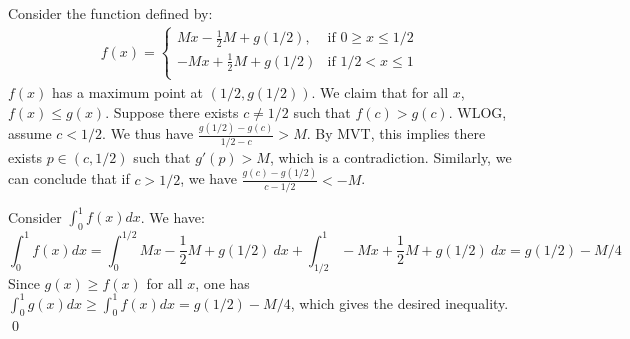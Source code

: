\documentclass{article}
\begin{document}
\begin{enumerate}[label=\alph*)]
        Consider the function defined by:
        \begin{align*}
            f(x) =
            \begin{cases}
                Mx-\frac{1}{2}M+g(1/2),  & \text{if $0\geq x\leq 1/2$} \\
                -Mx+\frac{1}{2}M+g(1/2)  & \text{if $1/2<x \leq 1$}\\
            \end{cases}
        \end{align*}
        $f(x)$ has a maximum point at $(1/2, g(1/2))$. We claim that for all $x$, $f(x) \leq g(x)$. Suppose there exists $c \neq 1/2$ such that $f(c)>g(c)$. WLOG, assume $c < 1/2$. We thus have $\frac{g(1/2)-g(c)}{1/2-c}>M$. By MVT, this implies there exists $p \in (c, 1/2)$ such that $g'(p)>M$, which is a contradiction. Similarly, we can conclude that if $c>1/2$, we have $\frac{g(c)-g(1/2)}{c-1/2}<-M$.
        
        Consider $\int^1_0 f(x) dx$. We have:
        \begin{equation*}
            \int^1_0 f(x) dx=\int^{1/2}_0 Mx-\frac{1}{2}M+g(1/2) \ dx + \int^{1}_{1/2} -Mx+\frac{1}{2}M+g(1/2)\ dx = g(1/2)-M/4
        \end{equation*}
        Since $g(x)\geq f(x)$ for all $x$, one has $\int^1_0 g(x) dx \geq \int^1_0 f(x) dx = g(1/2)-M/4$, which gives the desired inequality. \qed
\end{enumerate}
\end{document}
